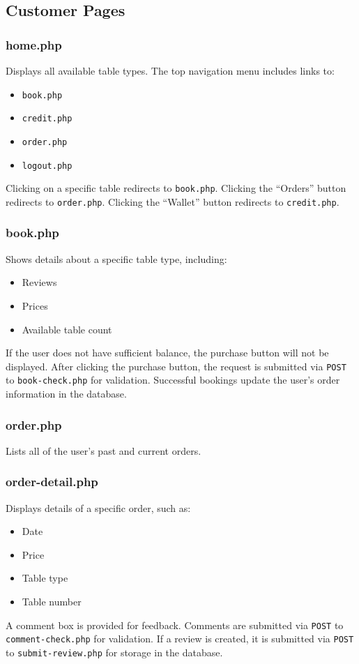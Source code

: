 \documentclass[12pt]{article}
\begin{document}
\subsection{Customer Pages}

\subsubsection{home.php}
Displays all available table types. The top navigation menu includes links to:
\begin{itemize}
    \item \texttt{book.php}
    \item \texttt{credit.php}
    \item \texttt{order.php}
    \item \texttt{logout.php}
\end{itemize}
Clicking on a specific table redirects to \texttt{book.php}.  
Clicking the ``Orders'' button redirects to \texttt{order.php}.  
Clicking the ``Wallet'' button redirects to \texttt{credit.php}.

\subsubsection{book.php}
Shows details about a specific table type, including:
\begin{itemize}
    \item Reviews
    \item Prices
    \item Available table count
\end{itemize}
If the user does not have sufficient balance, the purchase button will not be displayed.  
After clicking the purchase button, the request is submitted via \texttt{POST} to \texttt{book-check.php} for validation. Successful bookings update the user's order information in the database.

\subsubsection{order.php}
Lists all of the user's past and current orders.

\subsubsection{order-detail.php}
Displays details of a specific order, such as:
\begin{itemize}
    \item Date
    \item Price
    \item Table type
    \item Table number
\end{itemize}
A comment box is provided for feedback.  
Comments are submitted via \texttt{POST} to \texttt{comment-check.php} for validation.  
If a review is created, it is submitted via \texttt{POST} to \texttt{submit-review.php} for storage in the database.
\end{document}
